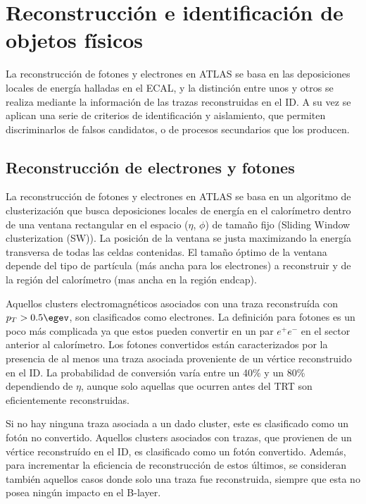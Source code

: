 \chapter{Reconstrucción e identificación de objetos físicos}


La reconstrucción de fotones y electrones en ATLAS se basa en las deposiciones locales de energía halladas en el ECAL, y la distinción entre unos y otros se   realiza mediante la información de las trazas reconstruidas en el ID. A su vez se aplican una serie de criterios de identificación y aislamiento, que permiten discriminarlos de falsos candidatos, o de procesos secundarios que los producen.

\section{Reconstrucción de electrones y fotones}

La  reconstrucción de fotones y electrones en ATLAS se basa en un algoritmo de clusterización \cite{Lampl:1099735} que busca deposiciones locales de energía en el calorímetro dentro de una ventana rectangular en el espacio ($\eta$, $\phi$) de tamaño fijo (Sliding Window clusterization (SW)). La posición de la ventana se  justa maximizando la energía transversa de todas las celdas contenidas. El tamaño óptimo de la ventana depende del tipo de partícula (más ancha para los electrones) a reconstruir y de la región del calorímetro (mas ancha en la región endcap). 

Aquellos clusters electromagnéticos asociados con una traza reconstruída con $p_{T} > 0.5 \egev$, son clasificados como electrones. La definición para fotones es un poco más complicada ya que estos pueden convertir en un par $e^{+}e^{-}$ en el sector anterior al calorímetro. Los fotones convertidos están caracterizados por la presencia de al menos una traza asociada proveniente de un vértice reconstruido en el ID. La probabilidad de conversión varía entre un 40\% y un 80\% dependiendo de $\eta$, aunque solo aquellas que ocurren antes del TRT son eficientemente reconstruidas. 

Si no hay ninguna traza asociada a un dado cluster, este es clasificado como un fotón no convertido. Aquellos clusters asociados con trazas, que provienen de un vértice reconstruído en el ID, es clasificado como un fotón convertido. Además, para incrementar la eficiencia de reconstrucción de estos últimos, se consideran también aquellos casos donde solo una traza fue reconstruida, siempre que esta no posea ningún impacto en el B-layer.

